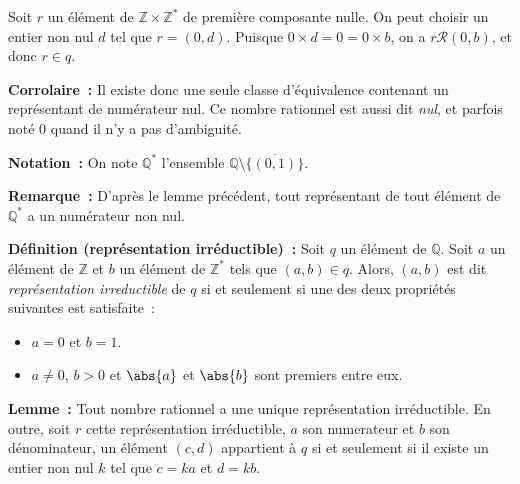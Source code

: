     Soit $r$ un élément de $\mathbb{Z} \times \mathbb{Z}^*$ de première composante nulle.
    On peut choisir un entier non nul $d$ tel que $r = (0, d)$.
    Puisque $0 \times d = 0 = 0 \times b$, on a $r \mathrel{\mathcal{R}} (0, b)$, et donc $r \in q$.

    \done

\medskip

\noindent\textbf{Corrolaire :} Il existe donc une seule classe d'équivalence contenant un représentant de numérateur nul. 
Ce nombre rationnel est aussi dit \emph{nul}, et parfois noté $0$ quand il n'y a pas d'ambiguité.

\medskip

\noindent\textbf{Notation :} On note $\mathbb{Q}^*$ l'ensemble $\mathbb{Q} \setminus \big\lbrace \overline{(0,1)} \big\rbrace$.

\medskip

\noindent\textbf{Remarque :} D'après le lemme précédent, tout représentant de tout élément de $\mathbb{Q}^*$ a un numérateur non nul.

\medskip

\noindent\textbf{Définition (représentation irréductible) :} 
    Soit $q$ un élément de $\mathbb{Q}$. 
    Soit $a$ un élément de $\mathbb{Z}$ et $b$ un élément de $\mathbb{Z}^*$ tels que $(a, b) \in q$.
    Alors, $(a, b)$ est dit \textit{représentation irreductible} de $q$ si et seulement si une des deux propriétés suivantes est satisfaite : 
    \begin{itemize}[nosep]
        \item $a = 0$ et $b = 1$.
        \item $a \neq 0$, $b > 0$ et $\abs{a}$ et $\abs{b}$ sont premiers entre eux.
    \end{itemize}

\medskip

\noindent\textbf{Lemme :} Tout nombre rationnel a une unique représentation irréductible. 
    En outre, soit $r$ cette représentation irréductible, $a$ son numerateur et $b$ son dénominateur, un élément $(c, d)$ appartient à $q$ si et seulement si il existe un entier non nul $k$ tel que $c = k a$ et $d = k b$.

\medskip

